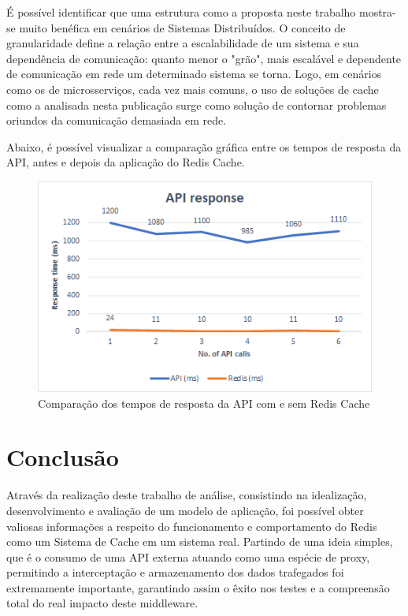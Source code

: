\documentclass[12pt]{article}
\begin{document}
É possível identificar que uma estrutura como a proposta neste trabalho mostra-se muito benéfica em cenários de Sistemas Distribuídos. O conceito de granularidade define a relação entre a escalabilidade de um sistema e sua dependência de comunicação: quanto menor o "grão", mais escalável e dependente de comunicação em rede um determinado sistema se torna. Logo, em cenários como os de microsserviços, cada vez mais comuns, o uso de soluções de cache como a analisada nesta publicação surge como solução de contornar problemas oriundos da comunicação demasiada em rede.

Abaixo, é possível visualizar a comparação gráfica entre os tempos de resposta da API, antes e depois da aplicação do Redis Cache.

\begin{figure}[ht!]
    \centering
    \includegraphics{images/Grafico.png}
    \caption{Comparação dos tempos de resposta da API com e sem Redis Cache}
    \label{fig:my_label}
\end{figure}

\section{Conclusão}

Através da realização deste trabalho de análise, consistindo na idealização, desenvolvimento e avaliação de um modelo de aplicação, foi possível obter valiosas informações a respeito do funcionamento e comportamento do Redis como um Sistema de Cache em um sistema real. Partindo de uma ideia simples, que é o consumo de uma API externa atuando como uma espécie de proxy, permitindo a interceptação e armazenamento dos dados trafegados foi extremamente importante, garantindo assim o êxito nos testes e a compreensão total do real impacto deste middleware.
\end{document}
